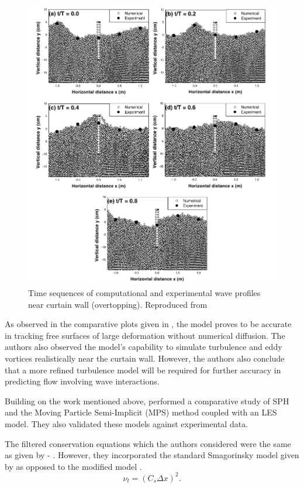 \begin{figure}[htbp!]
    \centering
    \includegraphics[width=12cm]{Figures/research_papers/gotoh2004-wave-profile-result.png}
    \caption{Time sequences of computational and experimental wave profiles near curtain wall (overtopping). Reproduced from \cite{Gotoh2004}}
    \label{fig:gotoh2004-wave-profile-result}
\end{figure}

As observed in the comparative plots given in , the model proves to be accurate in tracking free surfaces of large deformation without numerical diffusion. The authors also observed the model’s capability to simulate turbulence and eddy vortices realistically near the curtain wall. However, the authors also conclude that a more refined turbulence model will be required for further accuracy in predicting flow involving wave interactions.

Building on the work mentioned above, \cite{Shao2005} performed a comparative study of SPH and the Moving Particle Semi-Implicit (MPS) method coupled with an LES model. They also validated these models against experimental data.

The filtered conservation equations which the authors considered were the same as given by  - . However, they incorporated the standard Smagorinsky model \parencite{smagorinsky1963general} given by  as opposed to the modified model .
\begin{equation}
    \nu_t = (C_s \Delta x)^2.
    \label{eq:Shao2005-eddy-visc}
\end{equation}

